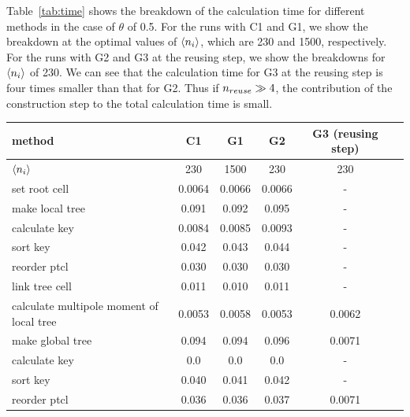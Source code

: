 \documentclass[dvipdfmx]{pasj01}
\begin{document}
Table~\ref{tab:time} shows the breakdown of the calculation time for
different methods in the case of $\theta$ of 0.5. For the runs with C1
and G1, we show the breakdown at the optimal values of $\langle n_{\rm
  i} \rangle $, which are 230 and 1500, respectively. For the runs
with G2 and G3 at the reusing step, we show the breakdowns for
$\langle n_{\rm i} \rangle $ of 230. We can see that the calculation
time for G3 at the reusing step is four times smaller than that for
G2. Thus if $n_{\rm reuse} \gg 4$, the contribution of the
construction step to the total calculation time is small.

\begin{table}
  \begin{tabular}{lccccc}
    \toprule
    method  & C1 & G1  & G2 & G3 (reusing step) \\
    \midrule
    $\langle n_{\rm i} \rangle$ & 230 & 1500 & 230 & 230 \\
    \midrule
    set root cell                                     & 0.0064  & 0.0066   & 0.0066   & - \\
    make local tree                                   & 0.091   & 0.092    & 0.095    & - \\
    \hspace{8dd} calculate key                        & 0.0084  & 0.0085   & 0.0093   & - \\
    \hspace{8dd} sort key                             & 0.042   & 0.043    & 0.044    & - \\
    \hspace{8dd} reorder ptcl                         & 0.030   & 0.030    & 0.030    & - \\
    \hspace{8dd} link tree cell                       & 0.011   & 0.010    & 0.011    & - \\
    calculate multipole moment of local tree          & 0.0053  & 0.0058   & 0.0053   & 0.0062 \\
    make global tree                                  & 0.094   & 0.094    & 0.096    & 0.0071  \\
    \hspace{8dd} calculate key                        & 0.0     & 0.0      & 0.0      & -      \\
    \hspace{8dd} sort key                             & 0.040   & 0.041    & 0.042    & -      \\
    \hspace{8dd} reorder ptcl                         & 0.036   & 0.036    & 0.037    & 0.0071 \\

\end{tabular}
\end{table}
\end{document}
